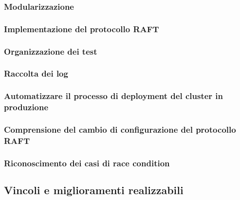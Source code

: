\documentclass[acmtog]{acmart}
\begin{document}
\subsubsection{Modularizzazione}

\subsubsection{Implementazione del protocollo RAFT}

\subsubsection{Organizzazione dei test}

\subsubsection{Raccolta dei log}

\subsubsection{Automatizzare il processo di deployment del cluster in produzione}

\subsubsection{Comprensione del cambio di configurazione del protocollo RAFT}

\subsubsection{Riconoscimento dei casi di race condition}

\subsection{Vincoli e miglioramenti realizzabili}
\end{document}
